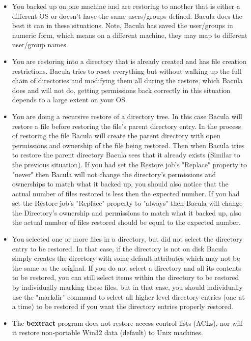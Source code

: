 \begin{itemize}
\item You backed up on one machine and are restoring to another that is 
   either a different OS or doesn't have the same users/groups defined.  Bacula
   does the best it can in these situations. Note, Bacula has saved the
   user/groups in numeric form, which means on a different machine, they
   may map to different user/group names.

\item You are restoring into a directory that is already created and has
   file creation restrictions.  Bacula tries to reset everything but
   without walking up the full chain of directories and modifying them all
   during the restore, which Bacula does and will not do, getting
   permissions back correctly in this situation depends to a large extent
   on your OS.

\item You are doing a recursive restore of a directory tree.  In this case
   Bacula will restore a file before restoring the file's parent directory
   entry.  In the process of restoring the file Bacula will create the
   parent directory with open permissions and ownership of the file being
   restored.  Then when Bacula tries to restore the parent directory Bacula
   sees that it already exists (Similar to the previous situation).  If you
   had set the Restore job's "Replace" property to "never" then Bacula will
   not change the directory's permissions and ownerships to match what it
   backed up, you should also notice that the actual number of files
   restored is less then the expected number.  If you had set the Restore
   job's "Replace" property to "always" then Bacula will change the
   Directory's ownership and permissions to match what it backed up, also
   the actual number of files restored should be equal to the expected
   number.

\item You selected one or more files in a directory, but did not select the
   directory entry to be restored.  In that case, if the directory is not
   on disk Bacula simply creates the directory with some default attributes
   which may not be the same as the original.  If you do not select a
   directory and all its contents to be restored, you can still select
   items within the directory to be restored by individually marking those
   files, but in that case, you should individually use the "markdir"
   command to select all higher level directory entries (one at a time) to
   be restored if you want the directory entries properly restored.

\item The {\bf bextract} program does not restore access control lists
  (ACLs), nor will it restore non-portable Win32 data (default) to Unix
  machines.
\end{itemize}

